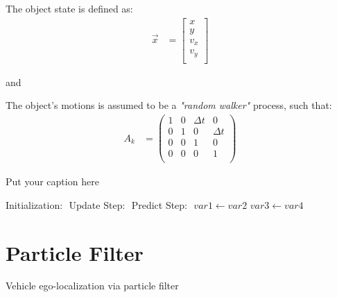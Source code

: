 \documentclass[•]{article}
\begin{document}
The object state is defined as: 
\begin{align}
    \vec{x} &= \begin{bmatrix}
           	    x  \\
           		y \\
               v_x \\
          	   v_y\\
         \end{bmatrix}
\end{align}

and 


The object's motions is assumed to be a \textsl{"random walker"} process, such that:
\begin{align}
   A_k &= \begin{pmatrix}
           	    1 & 0    & \Delta t & 0  \\
           		0 & 1    & 0        & \Delta t \\
                0 & 0    &        1 & 0 \\
          	    0 & 0    & 0       & 1 \\
         \end{pmatrix}
\end{align}
\begin{algorithm}[H]
\caption{Put your caption here}
\begin{algorithmic}[1]

     
 	\State Initialization: $ $
	\State Update Step: $ $
	\State Predict Step: $ $
    \EndFor
      
        \State $var1 \leftarrow var2$  
        \State $var3 \leftarrow var4$
    \EndWhile  \label{roy's loop}
\end{algorithmic}
\end{algorithm}


\section{Particle Filter}
Vehicle ego-localization via particle filter
\end{document}
